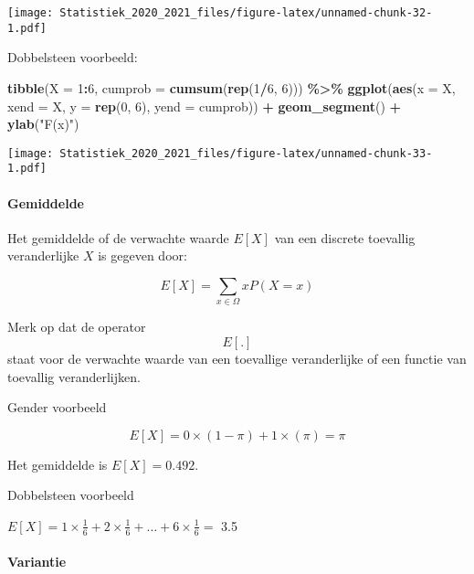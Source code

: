 \documentclass[
  12pt,dutch,coursenotes]{book}
\newenvironment{Shaded}{\begin{snugshade}}{\end{snugshade}}
\newcommand{\DataTypeTok}[1]{\textcolor[rgb]{0.13,0.29,0.53}{#1}}
\newcommand{\DecValTok}[1]{\textcolor[rgb]{0.00,0.00,0.81}{#1}}
\newcommand{\KeywordTok}[1]{\textcolor[rgb]{0.13,0.29,0.53}{\textbf{#1}}}
\newcommand{\NormalTok}[1]{#1}
\newcommand{\OperatorTok}[1]{\textcolor[rgb]{0.81,0.36,0.00}{\textbf{#1}}}
\newcommand{\StringTok}[1]{\textcolor[rgb]{0.31,0.60,0.02}{#1}}
\theoremstyle{definition}
\theoremstyle{definition}
\theoremstyle{definition}
\theoremstyle{remark}
\begin{document}
\texttt{[image: Statistiek\_2020\_2021\_files/figure-latex/unnamed-chunk-32-1.pdf]}

Dobbelsteen voorbeeld:

\begin{Shaded}
\begin{Highlighting}[]
\KeywordTok{tibble}\NormalTok{(}\DataTypeTok{X =} \DecValTok{1}\OperatorTok{:}\DecValTok{6}\NormalTok{, }\DataTypeTok{cumprob =} \KeywordTok{cumsum}\NormalTok{(}\KeywordTok{rep}\NormalTok{(}\DecValTok{1}\OperatorTok{/}\DecValTok{6}\NormalTok{, }\DecValTok{6}\NormalTok{))) }\OperatorTok{\%\textgreater{}\%}\StringTok{ }
\StringTok{    }\KeywordTok{ggplot}\NormalTok{(}\KeywordTok{aes}\NormalTok{(}\DataTypeTok{x =}\NormalTok{ X, }\DataTypeTok{xend =}\NormalTok{ X, }\DataTypeTok{y =} \KeywordTok{rep}\NormalTok{(}\DecValTok{0}\NormalTok{, }\DecValTok{6}\NormalTok{), }\DataTypeTok{yend =}\NormalTok{ cumprob)) }\OperatorTok{+}\StringTok{ }
\StringTok{    }\KeywordTok{geom\_segment}\NormalTok{() }\OperatorTok{+}\StringTok{ }\KeywordTok{ylab}\NormalTok{(}\StringTok{"F(x)"}\NormalTok{)}
\end{Highlighting}
\end{Shaded}

\texttt{[image: Statistiek\_2020\_2021\_files/figure-latex/unnamed-chunk-33-1.pdf]}

\hypertarget{gemiddelde}{%
\paragraph{Gemiddelde}\label{gemiddelde}}

Het gemiddelde of de verwachte waarde \(E[X]\) van een discrete toevallig veranderlijke \(X\) is gegeven door:

\[E[X]=\sum\limits_{x\in\Omega} x P(X=x)\]

Merk op dat de operator \[E[.]\] staat voor de verwachte waarde van een toevallige veranderlijke of een functie van toevallig veranderlijken.

Gender voorbeeld

\[E[X]= 0 \times (1-\pi) + 1 \times (\pi) = \pi\]

Het gemiddelde is \(E[X]=0.492\).

Dobbelsteen voorbeeld

\(E[X]= 1 \times \frac{1}{6} + 2 \times \frac{1}{6} + \ldots + 6 \times \frac{1}{6} =\) 3.5

\hypertarget{variantie}{%
\paragraph{Variantie}\label{variantie}}
\end{document}
